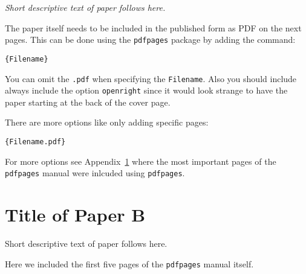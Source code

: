 \documentclass[%
]{USN-MSc}
\begin{document}
\emph{Short descriptive text of paper follows here.}\bigskip

The paper itself needs to be included in the published form as PDF on the next pages.
This can be done using the \texttt{pdfpages} package by adding the command:

\begin{verbatim}
{Filename}
\end{verbatim}

You can omit the \texttt{.pdf} when specifying the \texttt{Filename}. Also you should include always include the option \texttt{openright} since it would look strange to have the paper starting at the back of the cover page.

There are more options like only adding specific pages:
\begin{verbatim}
{Filename.pdf}
\end{verbatim}

For more options see Appendix~\ref{paper-b} where the most important pages of the \texttt{pdfpages} manual were inlcuded using \texttt{pdfpages}.




\chapter[Short Title of Paper B]{Title of Paper B}
\label{paper-b}
Short descriptive text of paper follows here.

Here we included the first five pages of the \texttt{pdfpages} manual itself.


\end{document}
